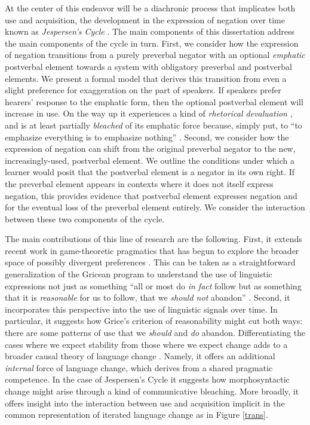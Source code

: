 \documentclass[12pt]{article}
\theoremstyle{definition} \newtheorem{definition}{Definition}
\begin{document}
At the center of this endeavor will be a diachronic process that implicates both use and acquisition, the development in the expression of negation over time known as \emph{Jespersen's Cycle} \citeyearpar{jespersen:1917}. The main components of this dissertation address the main components of the cycle in turn. First, we consider how the expression of negation transitions from a purely preverbal negator with an optional \emph{emphatic} postverbal element towards a system with obligatory preverbal and postverbal elements. We present a formal model that derives this transition from even a slight preference for exaggeration on the part of speakers. If speakers prefer hearers' response to the emphatic form, then the optional postverbal element will increase in use. On the way up it experiences a kind of \emph{rhetorical devaluation} \citep{dahl:2001}, and is at least partially \emph{bleached} of its emphatic force because, simply put, to ``to emphasize everything is to emphasize nothing'' \citep{kiparsky-
condoravdi:2006}. Second, we consider how the expression of negation can shift from the original preverbal negator to the new, increasingly-used, postverbal element. We outline the conditions under which a learner would posit that the postverbal element is a negator in its own right. If the preverbal element appears in contexts where it does not itself express negation, this provides evidence that postverbal element expresses negation and for the eventual loss of the preverbal element entirely. We consider the interaction between these two components of the cycle.

The main contributions of this line of research are the following. First,  it extends recent work in game-theoretic pragmatics that has begun to explore the broader space of possibly divergent preferences \citep{benz-jager-van-rooij:2006, franke:2008, franke-etal:2012, de-jaegher-van-rooij:2013}. This can be taken as a straightforward generalization of the Gricean program to understand the use of linguistic expressions not just as something ``all or most do \emph{in fact} follow but as something that it is \emph{reasonable} for us to follow, that we \emph{should not} abandon'' \citep[29]{Grice:1975}.  Second, it incorporates this perspective into the use of linguistic signals over time. In particular, it suggests how Grice's criterion of reasonability might cut both ways: there are some patterns of use that we \emph{should} and \emph{do} abandon. Differentiating the cases where we expect stability from those where we expect change adds to a broader causal theory of language change \citep{yang2000internal}. 
Namely, it offers an additional \emph{internal} force of language change, which derives from a shared pragmatic competence. In the case of Jespersen's Cycle it suggests how morphosyntactic change might arise through a kind of communicative bleaching.   More broadly, it offers insight into the interaction between use and acquisition implicit in the common representation of iterated language change as in Figure \ref{trans}.
\end{document}

